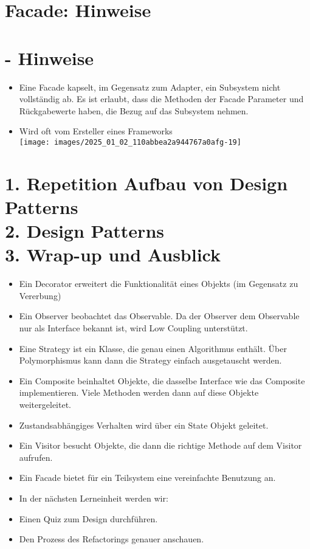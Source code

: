 \documentclass[10pt]{article}
\begin{document}
\section*{Facade: Hinweise}
\section*{- Hinweise}
\begin{itemize}
  \item Eine Facade kapselt, im Gegensatz zum Adapter, ein Subsystem nicht vollständig ab. Es ist erlaubt, dass die Methoden der Facade Parameter und Rückgabewerte haben, die Bezug auf das Subsystem nehmen.
  \item Wird oft vom Ersteller eines Frameworks\\
\texttt{[image: images/2025\_01\_02\_110abbea2a944767a0afg-19]}
\end{itemize}

\section*{1. Repetition Aufbau von Design Patterns \\
 2. Design Patterns \\
 3. Wrap-up und Ausblick }
\begin{itemize}
  \item Ein Decorator erweitert die Funktionalität eines Objekts (im Gegensatz zu Vererbung)
  \item Ein Observer beobachtet das Observable. Da der Observer dem Observable nur als Interface bekannt ist, wird Low Coupling unterstützt.
  \item Eine Strategy ist ein Klasse, die genau einen Algorithmus enthält. Über Polymorphismus kann dann die Strategy einfach ausgetauscht werden.
  \item Ein Composite beinhaltet Objekte, die dasselbe Interface wie das Composite implementieren. Viele Methoden werden dann auf diese Objekte weitergeleitet.
  \item Zustandsabhängiges Verhalten wird über ein State Objekt geleitet.
  \item Ein Visitor besucht Objekte, die dann die richtige Methode auf dem Visitor aufrufen.
  \item Ein Facade bietet für ein Teilsystem eine vereinfachte Benutzung an.
  \item In der nächsten Lerneinheit werden wir:
  \item Einen Quiz zum Design durchführen.
  \item Den Prozess des Refactorings genauer anschauen.
\end{itemize}
\end{document}
